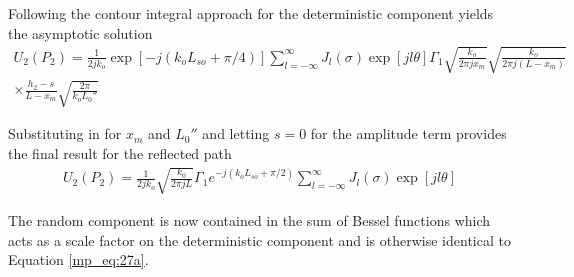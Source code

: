 Following the contour integral approach for the deterministic component yields the asymptotic solution
\begin{equation}
\begin{gathered}
U_2(P_2)= \frac{1}{2jk_o}\exp\left[-j\left(k_oL_{so}+\pi/4\right)\right]\sum_{l=-\infty}^{\infty}J_l(\sigma)\exp\left[jl\theta\right]\Gamma_1 \sqrt{\frac{k_o}{2\pi jx_m}}\sqrt{\frac{k_o}{2\pi j (L-x_m)}}\\ \times\frac{h_2-s}{L-x_m}\sqrt{\frac{2\pi}{k_oL_0''}}
\label{mp_eq:35}
\end{gathered}
\end{equation}
\renewcommand{\baselinestretch}{2} \small\normalsize

Substituting in for $x_m$ and $L_0''$ and letting $s = 0$ for the amplitude term provides the final result for the reflected path
\begin{equation}
\begin{gathered}
\boxed{U_2(P_2)= \frac{1}{2jk_o}\sqrt{\frac{k_0}{2\pi jL}}\Gamma_1 e^{-j\left(k_oL_{so}+\pi/2\right)}\sum_{l=-\infty}^{\infty}J_l(\sigma)\exp\left[jl\theta\right]} 
\label{mp_eq:36}
\end{gathered}
\end{equation}
\renewcommand{\baselinestretch}{2} \small\normalsize

The random component is now contained in the sum of Bessel functions which acts as a scale factor on the deterministic component and is otherwise identical to Equation \ref{mp_eq:27a}.
